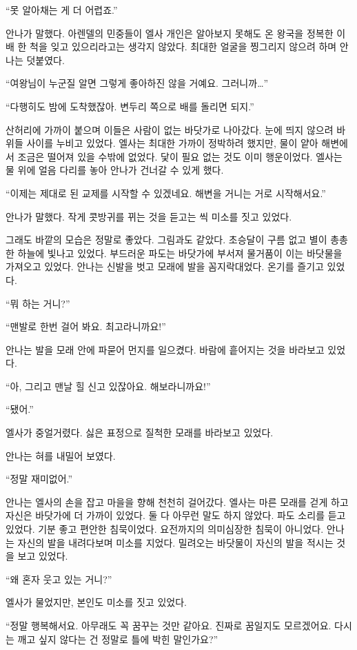 ``못 알아채는 게 더 어렵죠.''

안나가 말했다. 아렌델의 민중들이 엘사 개인은 알아보지 못해도 온 왕국을 정복한 이 배 한 척을 잊고 있으리라고는 생각지 않았다. 최대한 얼굴을 찡그리지 않으려 하며 안나는 덧붙였다.

``여왕님이 누군질 알면 그렇게 좋아하진 않을 거예요. 그러니까\ldots''

``다행히도 밤에 도착했잖아. 변두리 쪽으로 배를 돌리면 되지.''

산허리에 가까이 붙으며 이들은 사람이 없는 바닷가로 나아갔다. 눈에 띄지 않으려 바위들 사이를 누비고 있었다. 엘사는 최대한 가까이 정박하려 했지만, 물이 얕아 해변에서 조금은 떨어져 있을 수밖에 없었다. 닻이 필요 없는 것도 이미 행운이었다. 엘사는 물 위에 얼음 다리를 놓아 안나가 건너갈 수 있게 했다.

``이제는 제대로 된 교제를 시작할 수 있겠네요. 해변을 거니는 거로 시작해서요.''

안나가 말했다. 작게 콧방귀를 뀌는 것을 듣고는 씩 미소를 짓고 있었다.

그래도 바깥의 모습은 정말로 좋았다. 그림과도 같았다. 초승달이 구름 없고 별이 총총한 하늘에 빛나고 있었다. 부드러운 파도는 바닷가에 부서져 물거품이 이는 바닷물을 가져오고 있었다. 안나는 신발을 벗고 모래에 발을 꼼지락대었다. 온기를 즐기고 있었다.

``뭐 하는 거니?''

``맨발로 한번 걸어 봐요. 최고라니까요!''

안나는 발을 모래 안에 파묻어 먼지를 일으켰다. 바람에 흩어지는 것을 바라보고 있었다.

``아, 그리고 맨날 힐 신고 있잖아요. 해보라니까요!''

``됐어.''

엘사가 중얼거렸다. 싫은 표정으로 질척한 모래를 바라보고 있었다.

안나는 혀를 내밀어 보였다.

``정말 재미없어.''

안나는 엘사의 손을 잡고 마을을 향해 천천히 걸어갔다. 엘사는 마른 모래를 걷게 하고 자신은 바닷가에 더 가까이 있었다. 둘 다 아무런 말도 하지 않았다. 파도 소리를 듣고 있었다. 기분 좋고 편안한 침묵이었다. 요전까지의 의미심장한 침묵이 아니었다. 안나는 자신의 발을 내려다보며 미소를 지었다. 밀려오는 바닷물이 자신의 발을 적시는 것을 보고 있었다.

``왜 혼자 웃고 있는 거니?''

엘사가 물었지만, 본인도 미소를 짓고 있었다.

``정말 행복해서요. 아무래도 꼭 꿈꾸는 것만 같아요. 진짜로 꿈일지도 모르겠어요. 다시는 깨고 싶지 않다는 건 정말로 틀에 박힌 말인가요?''

